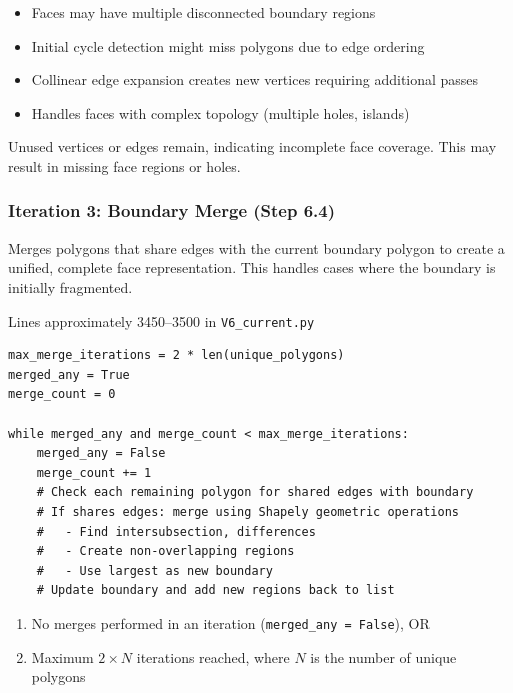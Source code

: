 \begin{itemize}
    \item Faces may have multiple disconnected boundary regions
    \item Initial cycle detection might miss polygons due to edge ordering
    \item Collinear edge expansion creates new vertices requiring additional passes
    \item Handles faces with complex topology (multiple holes, islands)
\end{itemize}

Unused vertices or edges remain, indicating incomplete face coverage. This may result in missing face regions or holes.

\subsubsection{Iteration 3: Boundary Merge (Step 6.4)}

Merges polygons that share edges with the current boundary polygon to create a unified, complete face representation. This handles cases where the boundary is initially fragmented.

Lines approximately 3450--3500 in \texttt{V6\_current.py}

\begin{lstlisting}
max_merge_iterations = 2 * len(unique_polygons)
merged_any = True
merge_count = 0

while merged_any and merge_count < max_merge_iterations:
    merged_any = False
    merge_count += 1
    # Check each remaining polygon for shared edges with boundary
    # If shares edges: merge using Shapely geometric operations
    #   - Find intersubsection, differences
    #   - Create non-overlapping regions
    #   - Use largest as new boundary
    # Update boundary and add new regions back to list
\end{lstlisting}

\begin{enumerate}
    \item No merges performed in an iteration (\texttt{merged\_any = False}), OR
    \item Maximum $2 \times N$ iterations reached, where $N$ is the number of unique polygons
\end{enumerate}


